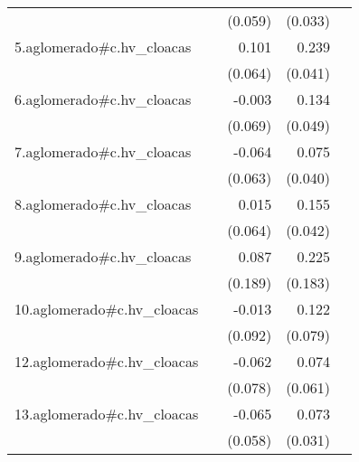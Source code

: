 {\begin{longtable}{l*{4}{D{.}{.}{-1}}}
            &                     &     (0.059)         &     (0.033)         &                     \\
\addlinespace
5.aglomerado#c.hv\_cloacas&                     &       0.101         &       0.239\sym{***}&                     \\
            &                     &     (0.064)         &     (0.041)         &                     \\
\addlinespace
6.aglomerado#c.hv\_cloacas&                     &      -0.003         &       0.134\sym{**} &                     \\
            &                     &     (0.069)         &     (0.049)         &                     \\
\addlinespace
7.aglomerado#c.hv\_cloacas&                     &      -0.064         &       0.075         &                     \\
            &                     &     (0.063)         &     (0.040)         &                     \\
\addlinespace
8.aglomerado#c.hv\_cloacas&                     &       0.015         &       0.155\sym{***}&                     \\
            &                     &     (0.064)         &     (0.042)         &                     \\
\addlinespace
9.aglomerado#c.hv\_cloacas&                     &       0.087         &       0.225         &                     \\
            &                     &     (0.189)         &     (0.183)         &                     \\
\addlinespace
10.aglomerado#c.hv\_cloacas&                     &      -0.013         &       0.122         &                     \\
            &                     &     (0.092)         &     (0.079)         &                     \\
\addlinespace
12.aglomerado#c.hv\_cloacas&                     &      -0.062         &       0.074         &                     \\
            &                     &     (0.078)         &     (0.061)         &                     \\
\addlinespace
13.aglomerado#c.hv\_cloacas&                     &      -0.065         &       0.073\sym{*}  &                     \\
            &                     &     (0.058)         &     (0.031)         &                     \\

\end{longtable}}
